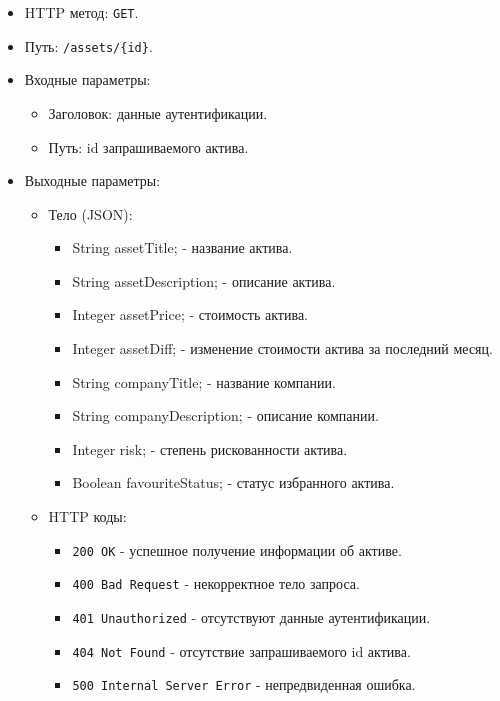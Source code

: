 \documentclass[a4paper, 14pt]{article}
\begin{document}
\begin{itemize}
    \item HTTP метод: \texttt{GET}.
    \item Путь: \texttt{/assets/\{id\}}.
    \item Входные параметры:
    \begin{itemize}
        \item Заголовок: данные аутентификации.
        \item Путь: id запрашиваемого актива.
    \end{itemize}
    \item Выходные параметры:
    \begin{itemize}
        \item Тело (JSON):
        \begin{itemize}
            \item String assetTitle; - название актива.
            \item String assetDescription; - описание актива.
            \item Integer assetPrice; - стоимость актива.
            \item Integer assetDiff; - изменение стоимости актива за последний месяц.
            \item String companyTitle; - название компании.
            \item String companyDescription; - описание компании.
            \item Integer risk; - степень рискованности актива.
            \item Boolean favouriteStatus; - статус избранного актива.
        \end{itemize}
        \item HTTP коды:
        \begin{itemize}
            \item \texttt{200 OK} - успешное получение информации об активе.
            \item \texttt{400 Bad Request} - некорректное тело запроса.
            \item \texttt{401 Unauthorized} - отсутствуют данные аутентификации.
            \item \texttt{404 Not Found} - отсутствие запрашиваемого id актива.
            \item \texttt{500 Internal Server Error} - непредвиденная ошибка.
        \end{itemize}
    \end{itemize}
\end{itemize}
\end{document}
